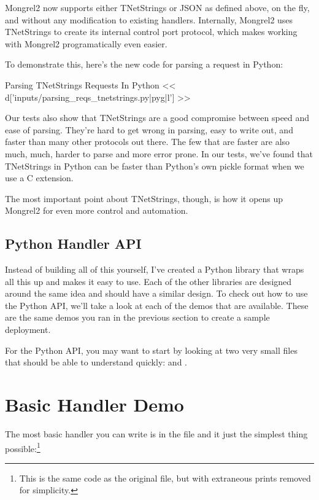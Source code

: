 Mongrel2 now supports either TNetStrings or JSON as defined above, on the
fly, and without any modification to existing handlers.  Internally, Mongrel2
uses TNetStrings to create its internal control port protocol, which makes
working with Mongrel2 programatically even easier.

To demonstrate this, here's the new code for parsing a request in Python:


\begin{code}{Parsing TNetStrings Requests In Python}
<< d['inputs/parsing_reqs_tnetstrings.py|pyg|l'] >>
\end{code}

Our tests also show that TNetStrings are a good compromise between
speed and ease of parsing.  They're hard to get wrong in parsing, easy
to write out, and faster than many other protocols out there.  The few
that are faster are also much, much, harder to parse and more error
prone.  In our tests, we've found that TNetStrings in Python can be
faster than Python's own pickle format when we use a C extension.

The most important point about TNetStrings, though, is how it opens up
Mongrel2 for even more control and automation.

\subsection{Python Handler API}

Instead of building all of this yourself, I've created a Python library
that wraps all this up and makes it easy to use.  Each of the other
libraries are designed around the same idea and should have a similar
design.  To check out how to use the Python API, we'll take a look at
each of the demos that are available.  These are the same demos you
ran in the previous section to create a sample deployment.

For the Python API, you may want to start by looking at two very small files that should be able to understand quickly:
 and
.


\section{Basic Handler Demo}

The most basic handler you can write is in the  file
and it just the simplest thing possible:\footnote{This is the same code as the original
file, but with extraneous prints removed for simplicity.}


